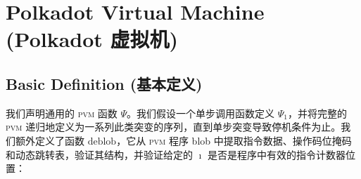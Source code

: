 \section{Polkadot Virtual Machine (Polkadot 虚拟机)}\label{sec:virtualmachine}


\subsection{Basic Definition (基本定义)}
\newcommand*{\instr}[1]{\text{{\small \texttt{#1}}}}
\newcommand*{\regs}{\sequence[13]{\pvmreg}}
\newcommand*{\reg}{{\registers}}
\newcommand*{\mem}{{\memory}}
\newcommand*{\memr}{\cyclic{\mem}}
\newcommand*{\memwr}{\cyclic{\mem'}}
\newcommand*{\continue}{\blacktriangleright}
\newcommand*{\instrlen}{\ell}
\newcommand*{\revbitsfunc}[1]{\overleftarrow{\fnoctetstobits}_{#1}}
\newcommand*{\revunbitsfunc}[1]{\revbitsfunc{#1}^{-1}}
\newcommand*{\bitsfunc}[1]{\fnoctetstobits_{#1}}
\newcommand*{\unbitsfunc}[1]{\bitsfunc{#1}^{-1}}
\newcommand*{\bits}[1]{\bitsn{8}{#1}}
\newcommand*{\unbits}[1]{\unbitsn{8}{#1}}
\newcommand*{\bitsn}[2]{\bitsfunc{#1}(#2)}
\newcommand*{\unbitsn}[2]{\unbitsfunc{#1}(#2)}
\newcommand*{\RA}{\token{RA}}
\newcommand*{\SP}{\token{SP}}
\newcommand*{\T}{\token{T}}
\renewcommand*{\S}{\token{S}}
\newcommand*{\A}{\token{A}}
\newcommand*{\basicblocks}{\varpi}
\newcommand*{\instructions}{\zeta}
\newcommand*{\immed}{\nu}
\newcommand*{\deblob}{\text{deblob}}
\newcommand*{\smod}{\text{smod}}
\newcommand*{\rtz}{\text{rtz}}
\newcommand*{\gascostforblock}{\gascounter^{\Delta}}
\newcommand*{\startofbasicblock}{\mathfrak{L}}
我们声明通用的 \textsc{pvm} 函数 $\Psi$。我们假设一个单步调用函数定义 $\Psi_1$，并将完整的 \textsc{pvm} 递归地定义为一系列此类突变的序列，直到单步突变导致停机条件为止。我们额外定义了函数 $\deblob$，它从 \textsc{pvm} 程序 blob 中提取指令数据、操作码位掩码和动态跳转表，验证其结构，并验证给定的 $\imath$ 是否是程序中有效的指令计数器位置：
